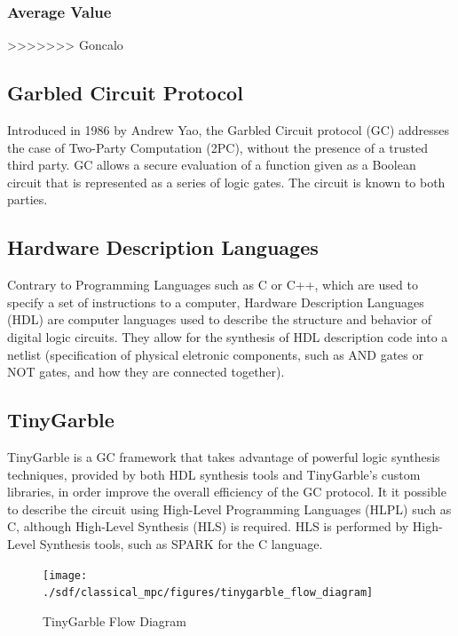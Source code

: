 \begin{refsection}
\subsubsection{Average Value}


>>>>>>> Goncalo



\subsection{Garbled Circuit Protocol}
Introduced in 1986 by Andrew Yao, the Garbled Circuit protocol (GC) addresses the case
of Two-Party Computation (2PC), without the presence of a trusted third party.
GC allows a secure evaluation of a function given as a Boolean circuit that is represented as a series of logic gates.
The circuit is known to both parties.\\

\subsection{Hardware Description Languages}
Contrary to Programming Languages such as C or C++, which are used to specify a set of instructions to a computer, Hardware Description Languages (HDL) are computer languages used to describe the structure and behavior of digital logic circuits. They allow for the synthesis of HDL description code into a netlist (specification of physical eletronic components, such as AND gates or NOT gates, and how they are connected together).

\subsection{TinyGarble}
TinyGarble is a GC framework that takes advantage of powerful logic synthesis techniques, provided by both HDL synthesis tools
and TinyGarble's custom libraries, in order improve the overall efficiency of the GC protocol.
It it possible to describe the circuit using High-Level Programming Languages (HLPL) such as C, although High-Level Synthesis (HLS) is required. HLS is performed by High-Level Synthesis tools, such as SPARK for the C language.

\renewcommand{\figurename}{Figure}
\begin{figure}[H]
\centering
\texttt{[image: ./sdf/classical\_mpc/figures/tinygarble\_flow\_diagram]}
\caption{TinyGarble Flow Diagram}
\label{fig:tgdiagram}
\end{figure}


\end{refsection}
